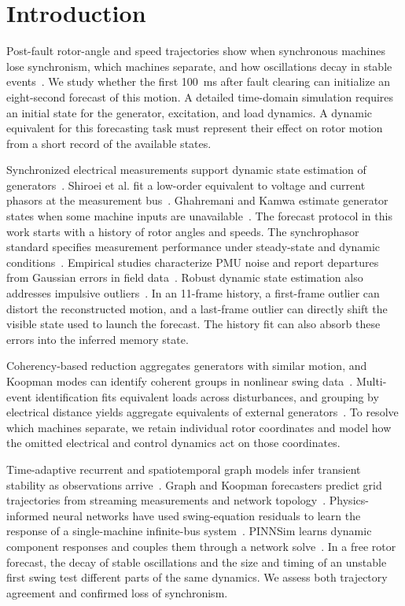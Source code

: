 \section{Introduction}
\label{sec:intro}
Post-fault rotor-angle and speed trajectories show when synchronous machines
lose synchronism, which machines separate, and how oscillations decay in
stable events~\cite{hatziargyriou2021stability}. We study whether the first
100~ms after fault clearing can initialize an eight-second forecast of this
motion. A detailed time-domain simulation requires an initial state for
the generator, excitation, and load dynamics. A dynamic equivalent for this
forecasting task must represent their effect on rotor motion from a short
record of the available states.

Synchronized electrical measurements support dynamic state estimation of
generators~\cite{phadke2008phasors,singh2014dynamic}. Shiroei et al. fit a
low-order equivalent to voltage and current phasors at the measurement
bus~\cite{shiroei2016pmu}. Ghahremani and Kamwa estimate generator states
when some machine inputs are unavailable~\cite{ghahremani2011dynamic}.
The forecast protocol in this work starts with a history of rotor angles
and speeds. The synchrophasor standard specifies measurement performance
under steady-state and dynamic conditions~\cite{ieee60255_2018}.
Empirical studies characterize PMU noise and report departures from
Gaussian errors in field data~\cite{brown2016pmu,wang2018pmu}.
Robust dynamic state estimation also addresses impulsive outliers~\cite{zhao2017robust}. In an 11-frame history, a first-frame outlier can
distort the reconstructed motion, and a last-frame outlier can directly
shift the visible state used to launch the forecast. The history fit can
also absorb these errors into the inferred memory state.

Coherency-based reduction aggregates generators with similar motion, and
Koopman modes can identify coherent groups in nonlinear swing
data~\cite{chow1982coherency,susuki2011koopman}. Multi-event identification
fits equivalent loads across disturbances, and grouping by electrical
distance yields aggregate equivalents of external
generators~\cite{jiang2020multievent,jardim2017robust}. To resolve which
machines separate, we retain individual rotor coordinates and model
how the omitted electrical and control dynamics act on those coordinates.

Time-adaptive recurrent and spatiotemporal graph models infer transient
stability as observations arrive~\cite{chen2021adaptive,liu2022graph}.
Graph and Koopman forecasters predict grid trajectories from streaming
measurements and network topology~\cite{nandanoori2022graph}. Physics-informed
neural networks have used swing-equation residuals to learn the response
of a single-machine infinite-bus system~\cite{misyris2020pinn}.
PINNSim learns dynamic component responses and couples them through a
network solve~\cite{stiasny2024pinnsim}. In a free rotor forecast, the
decay of stable oscillations and the size and timing of an unstable first
swing test different parts of the same dynamics. We assess both trajectory
agreement and confirmed loss of synchronism.

